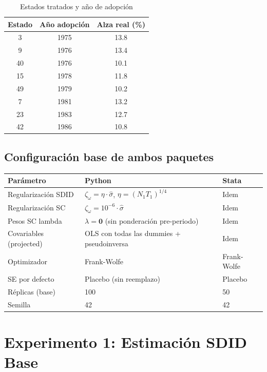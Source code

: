 \documentclass[11pt, a4paper]{article}
\newcommand{\py}{\textcolor{pyblue}{\textbf{Python}}}
\newcommand{\st}{\textcolor{stgreen}{\textbf{Stata}}}
\begin{document}
\begin{table}[H]
\centering
\caption{Estados tratados y año de adopción}
\begin{tabular}{ccc}
\toprule
Estado & Año adopción & Alza real (\%) \\
\midrule
3  & 1975 & 13.8 \\
9  & 1976 & 13.4 \\
40 & 1976 & 10.1 \\
15 & 1978 & 11.8 \\
49 & 1979 & 10.2 \\
7  & 1981 & 13.2 \\
23 & 1983 & 12.7 \\
42 & 1986 & 10.8 \\
\bottomrule
\end{tabular}
\end{table}

\subsection*{Configuración base de ambos paquetes}

\begin{center}
\begin{tabular}{lll}
\toprule
Parámetro & \py{} & \st{} \\
\midrule
Regularización SDID & $\zeta_\omega = \eta \cdot \hat{\sigma}$, $\eta=(N_1 T_1)^{1/4}$ & Idem \\
Regularización SC   & $\zeta_\omega = 10^{-6} \cdot \hat{\sigma}$ & Idem \\
Pesos SC lambda     & $\lambda = \mathbf{0}$ (sin ponderación pre-periodo) & Idem \\
Covariables (projected) & OLS con todas las dummies + pseudoinversa & Idem \\
Optimizador & Frank-Wolfe & Frank-Wolfe \\
SE por defecto & Placebo (sin reemplazo) & Placebo \\
Réplicas (base) & 100 & 50 \\
Semilla & 42 & 42 \\
\bottomrule
\end{tabular}
\end{center}

\newpage
\section{Experimento 1: Estimación SDID Base}
\end{document}
